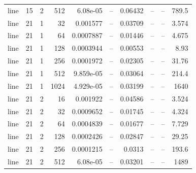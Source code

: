 \begin{tabular}{lrrrrrrrrr}
line & 15 & 2 & 512 & 6.08e-05 & -- & 0.06432 & -- & -- & 789.5 \\
line & 21 & 1 & 32 & 0.001577 & -- & 0.03709 & -- & -- & 3.574 \\
line & 21 & 1 & 64 & 0.0007887 & -- & 0.01446 & -- & -- & 4.675 \\
line & 21 & 1 & 128 & 0.0003944 & -- & 0.00553 & -- & -- & 8.93 \\
line & 21 & 1 & 256 & 0.0001972 & -- & 0.02305 & -- & -- & 31.76 \\
line & 21 & 1 & 512 & 9.859e-05 & -- & 0.03064 & -- & -- & 214.4 \\
line & 21 & 1 & 1024 & 4.929e-05 & -- & 0.03199 & -- & -- & 1640 \\
line & 21 & 2 & 16 & 0.001922 & -- & 0.04586 & -- & -- & 3.524 \\
line & 21 & 2 & 32 & 0.0009652 & -- & 0.01745 & -- & -- & 4.324 \\
line & 21 & 2 & 64 & 0.0004839 & -- & 0.01677 & -- & -- & 7.729 \\
line & 21 & 2 & 128 & 0.0002426 & -- & 0.02847 & -- & -- & 29.25 \\
line & 21 & 2 & 256 & 0.0001215 & -- & 0.0313 & -- & -- & 193.6 \\
line & 21 & 2 & 512 & 6.08e-05 & -- & 0.03201 & -- & -- & 1489 \\
\hline
\end{tabular}
